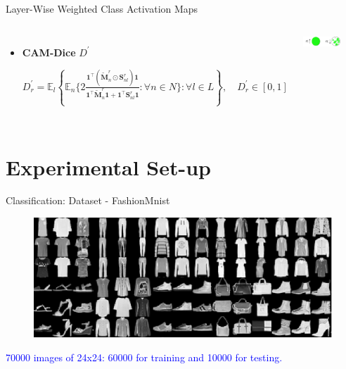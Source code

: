 \documentclass[aspectratio=169]{beamer}
\begin{document}
\begin{frame}{Layer-Wise Weighted Class Activation Maps}
\begin{columns}
\end{columns}




\begin{columns}

    \begin{itemize}
        \item  \textbf{CAM-Dice} $D^{'}$
    
    $D^{'}_r = \mathbb{E}_{l}\left\{\mathbb{E}_{n}\Biggl\{   2 \frac{\mathbf{1}^\top \left(\tilde{\mathbf{M}}^r_n \odot \mathbf{S}^r_{nl}\right) \mathbf{1}}{ \mathbf{1}^\top \tilde{\mathbf{M}}^r_n \mathbf{1} + \mathbf{1}^\top \mathbf{S}^r_{nl} \mathbf{1}} :\forall n\in N\Biggl\}:\forall l\in L\right\}, \quad D_{r}^{'}    \in [0,1]$

    \end{itemize}
    
    

    \includegraphics[trim={0.7cm 0 0 0},clip,width=0.65\textwidth]{Figures/dice_measure.pdf}
    
\end{columns}





\end{frame}





\section{Experimental Set-up}


\begin{frame}{Classification: Dataset - FashionMnist}

    \begin{figure}
        \centering
        \includegraphics[width=0.8\linewidth]{Figures/fashionMnist.png}
    \end{figure}

\begin{center}
    \textcolor{blue}{70000 images of 24x24: 60000 for training and 10000 for testing.}   
\end{center}

\end{frame}
\end{document}
